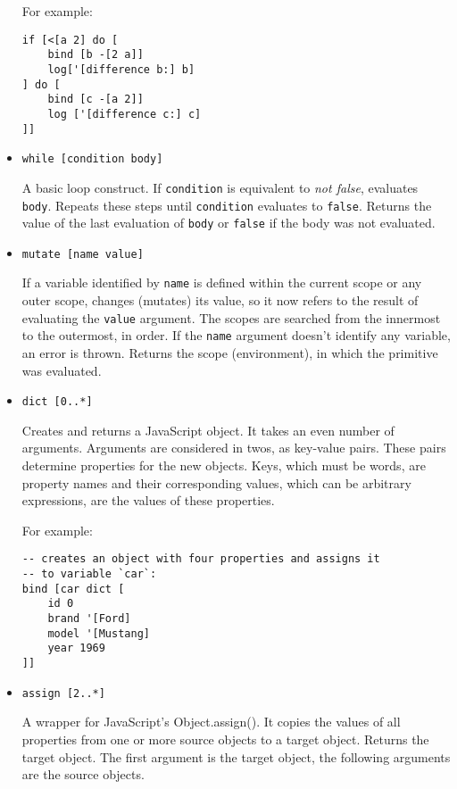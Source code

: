 \begin{itemize}
    For example:
\begin{lstlisting}
if [<[a 2] do [
    bind [b -[2 a]]
    log['[difference b:] b]
] do [
    bind [c -[a 2]]
    log ['[difference c:] c]
]]
\end{lstlisting}
    
    \item \texttt{while [condition body]}
    
    A basic loop construct. If \texttt{condition} is equivalent to \textit{not
        false}, evaluates \texttt{body}. Repeats these steps until
    \texttt{condition} evaluates to \texttt{false}. Returns the value of the
    last evaluation of \texttt{body} or \texttt{false} if the body was not
    evaluated.
    
    \item \texttt{mutate [name value]}
    
    If a variable identified by \texttt{name} is defined within the current
    scope or any outer scope, changes (mutates) its value, so it now refers to
    the result of evaluating the \texttt{value} argument. The scopes are
    searched from the innermost to the outermost, in order. If the \texttt{name}
    argument doesn't identify any variable, an error is thrown. Returns the
    scope (environment), in which the primitive was evaluated.
    
    \item \texttt{dict [0..*]}
    
    Creates and returns a JavaScript object. It takes an even number of arguments. Arguments are considered in twos, as key-value pairs. These pairs determine properties for the new objects. Keys, which must be words, are property names and their corresponding values, which can be arbitrary expressions, are the values of these properties.
    
    For example:
\begin{lstlisting}
-- creates an object with four properties and assigns it
-- to variable `car`:
bind [car dict [
    id 0
    brand '[Ford]
    model '[Mustang]
    year 1969 
]]
\end{lstlisting}
    
    \item \texttt{assign [2..*]}
    
    A wrapper for JavaScript's Object.assign()\cite{mdn_assign}. It copies the values of all properties from one or more source objects to a target object. Returns the target object. The first argument is the target object, the following arguments are the source objects.
    

\end{itemize}
